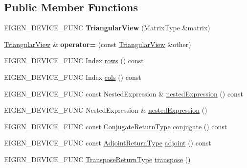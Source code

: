 \subsection*{Public Member Functions}
\begin{DoxyCompactItemize}
\item 
\mbox{\label{class_eigen_1_1_triangular_view_ae49e8808fd35de693fe2c988801bbc08}} 
E\+I\+G\+E\+N\+\_\+\+D\+E\+V\+I\+C\+E\+\_\+\+F\+U\+NC {\bfseries Triangular\+View} (Matrix\+Type \&matrix)
\item 
\mbox{\label{class_eigen_1_1_triangular_view_ab9762db604877dacd54184e06bc4b418}} 
\mbox{\hyperlink{class_eigen_1_1_triangular_view}{Triangular\+View}} \& {\bfseries operator=} (const \mbox{\hyperlink{class_eigen_1_1_triangular_view}{Triangular\+View}} \&other)
\item 
E\+I\+G\+E\+N\+\_\+\+D\+E\+V\+I\+C\+E\+\_\+\+F\+U\+NC Index \mbox{\hyperlink{class_eigen_1_1_triangular_view_a34de9aa9961062ff65f24bbeaef4e693}{rows}} () const
\item 
E\+I\+G\+E\+N\+\_\+\+D\+E\+V\+I\+C\+E\+\_\+\+F\+U\+NC Index \mbox{\hyperlink{class_eigen_1_1_triangular_view_ae0a22563fd472eca7aaf9bc5f29d2898}{cols}} () const
\item 
E\+I\+G\+E\+N\+\_\+\+D\+E\+V\+I\+C\+E\+\_\+\+F\+U\+NC const Nested\+Expression \& \mbox{\hyperlink{class_eigen_1_1_triangular_view_a83b7cdd9d9ea543a3c893fc2e74d8fbb}{nested\+Expression}} () const
\item 
E\+I\+G\+E\+N\+\_\+\+D\+E\+V\+I\+C\+E\+\_\+\+F\+U\+NC Nested\+Expression \& \mbox{\hyperlink{class_eigen_1_1_triangular_view_a62e7446cc39a920b8b59eb02380abc4b}{nested\+Expression}} ()
\item 
E\+I\+G\+E\+N\+\_\+\+D\+E\+V\+I\+C\+E\+\_\+\+F\+U\+NC const \mbox{\hyperlink{class_eigen_1_1_triangular_view}{Conjugate\+Return\+Type}} \mbox{\hyperlink{class_eigen_1_1_triangular_view_ae89c798826157831a2b1142d57f04405}{conjugate}} () const
\item 
E\+I\+G\+E\+N\+\_\+\+D\+E\+V\+I\+C\+E\+\_\+\+F\+U\+NC const \mbox{\hyperlink{class_eigen_1_1_triangular_view}{Adjoint\+Return\+Type}} \mbox{\hyperlink{class_eigen_1_1_triangular_view_ab36cd4a400b5a9944b87780ebd3bec43}{adjoint}} () const
\item 
E\+I\+G\+E\+N\+\_\+\+D\+E\+V\+I\+C\+E\+\_\+\+F\+U\+NC \mbox{\hyperlink{class_eigen_1_1_triangular_view}{Transpose\+Return\+Type}} \mbox{\hyperlink{class_eigen_1_1_triangular_view_a5336b45208d7e351aba7536aef153075}{transpose}} ()

\end{DoxyCompactItemize}
